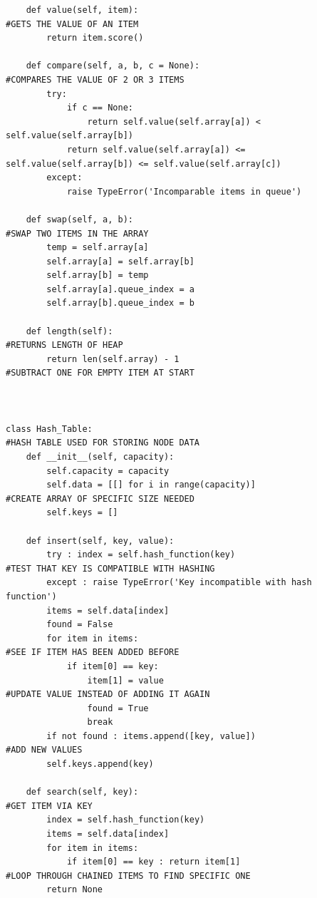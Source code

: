 \documentclass[titlepage]{article}
\begin{document}
\begin{changemargin}{-1in}{-1in}
\begin{verbatim}
    def value(self, item):                                                      #GETS THE VALUE OF AN ITEM
        return item.score()
        
    def compare(self, a, b, c = None):                                          #COMPARES THE VALUE OF 2 OR 3 ITEMS
        try:
            if c == None:
                return self.value(self.array[a]) < self.value(self.array[b])
            return self.value(self.array[a]) <= self.value(self.array[b]) <= self.value(self.array[c])
        except:
            raise TypeError('Incomparable items in queue')

    def swap(self, a, b):                                                       #SWAP TWO ITEMS IN THE ARRAY
        temp = self.array[a]
        self.array[a] = self.array[b]
        self.array[b] = temp
        self.array[a].queue_index = a
        self.array[b].queue_index = b

    def length(self):                                                           #RETURNS LENGTH OF HEAP
        return len(self.array) - 1                                              #SUBTRACT ONE FOR EMPTY ITEM AT START
    


class Hash_Table:                                                               #HASH TABLE USED FOR STORING NODE DATA
    def __init__(self, capacity):
        self.capacity = capacity
        self.data = [[] for i in range(capacity)]                               #CREATE ARRAY OF SPECIFIC SIZE NEEDED
        self.keys = []

    def insert(self, key, value):
        try : index = self.hash_function(key)                                   #TEST THAT KEY IS COMPATIBLE WITH HASHING
        except : raise TypeError('Key incompatible with hash function')     
        items = self.data[index]
        found = False
        for item in items:                                                      #SEE IF ITEM HAS BEEN ADDED BEFORE
            if item[0] == key:
                item[1] = value                                                 #UPDATE VALUE INSTEAD OF ADDING IT AGAIN
                found = True
                break
        if not found : items.append([key, value])                               #ADD NEW VALUES
        self.keys.append(key)

    def search(self, key):                                                      #GET ITEM VIA KEY
        index = self.hash_function(key)
        items = self.data[index]
        for item in items:
            if item[0] == key : return item[1]                                  #LOOP THROUGH CHAINED ITEMS TO FIND SPECIFIC ONE
        return None
    

\end{verbatim}
\end{changemargin}
\end{document}
